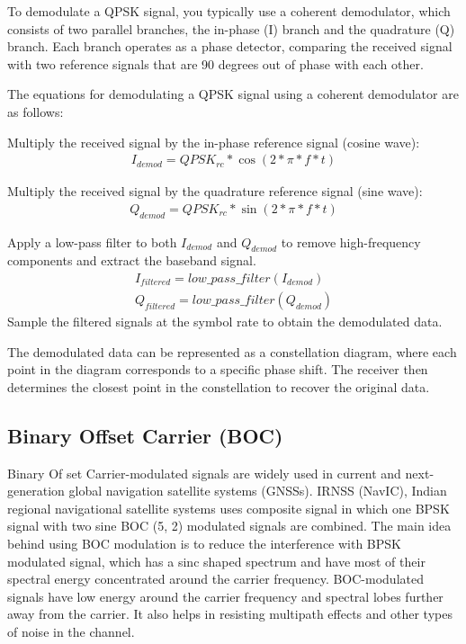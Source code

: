 \documentclass[onecolumn]{article}
\begin{document}
\begin{enumerate}
\begin{Large}
To demodulate a QPSK signal, you typically use a coherent demodulator, which consists of two parallel branches, the in-phase (I) branch and the quadrature (Q) branch. Each branch operates as a phase detector, comparing the received signal with two reference signals that are 90 degrees out of phase with each other.

The equations for demodulating a QPSK signal using a coherent demodulator are as follows:

Multiply the received signal by the in-phase reference signal (cosine wave):
\begin{align}
I_{demod} = QPSK_{rc} * \cos(2* \pi * f * t)
\end{align}

Multiply the received signal by the quadrature reference signal (sine wave):
\begin{align}
Q_{demod} = QPSK_{rc} * \sin(2* \pi * f * t)
\end{align}

Apply a low-pass filter to both $I_{demod}$ and $Q_{demod}$ to remove high-frequency components and extract the baseband signal.
\begin{align}
I_{filtered} = low\_pass\_filter (I_{demod})\\
Q_{filtered} = low\_pass\_filter (Q_{demod})
\end{align}
Sample the filtered signals at the symbol rate to obtain the demodulated data.

The demodulated data can be represented as a constellation diagram, where each point in the diagram corresponds to a specific phase shift. The receiver then determines the closest point in the constellation to recover the original data.

\subsection{Binary Offset Carrier (BOC)} 
Binary Of set Carrier-modulated signals are widely used in current and next- generation global navigation satellite systems (GNSSs). IRNSS (NavIC), Indian regional navigational satellite systems uses composite signal in which one BPSK signal with two sine BOC (5, 2) modulated signals are combined. The main idea behind using BOC modulation is to reduce the interference with BPSK modulated signal, which has a sinc shaped spectrum and have most of their spectral energy concentrated around the carrier frequency. BOC-modulated signals have low energy around the carrier frequency and spectral lobes further away from the carrier. It also helps in resisting multipath effects and other types of noise in the channel.


\end{Large}
\end{enumerate}
\end{document}

